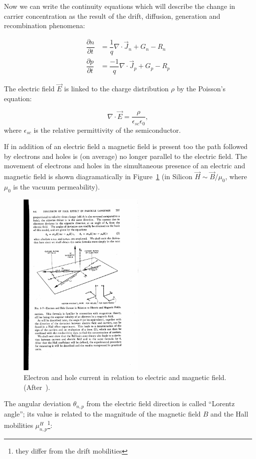 Now we can write the continuity equations which will describe the change in carrier concentration 
as the result of the drift, diffusion, generation and recombination phenomena:

\begin{align}
\dfrac{\partial n}{\partial t}&=\dfrac{1}{q}\nabla\cdot\vec{J}_n+G_n-R_n\label{eq:nCont}\\
\dfrac{\partial p}{\partial t}&=\dfrac{-1}{q}\nabla\cdot\vec{J}_p+G_p-R_p\label{eq:pCont}
\end{align}

The electric field $\vec{E}$ is linked to the charge distribution $\rho$ by the Poisson's equation:

\begin{equation}
\nabla\cdot\vec{E}=\dfrac{\rho}{\epsilon_{sc}\epsilon_{0}},
\label{eq:Poisson}
\end{equation}
where $\epsilon_{sc}$ is the relative permittivity of the semiconductor.



If in addition of an electric field a magnetic field is present too 
the path followed by electrons and holes is (on average) no longer parallel 
to the electric field. The movement of electrons and holes in the simultaneous presence of an electric and magnetic field is shown diagramatically in Figure~\ref{fig:LorentzAngle} 
(in Silicon $\vec H\sim\vec B/\mu_0$, where $\mu_0$ is the vacuum permeability).
\begin{figure}[htbp]
   \centering
   \includegraphics[width=0.55\textwidth]{LorentzAngle.pdf} 
   \caption{\label{fig:LorentzAngle}Electron and hole current in relation to electric and magnetic field. 
   (After~\cite{Shockley}).}
\end{figure}
The angular deviation $\theta_{n,p}$ from the electric field direction is called ``Lorentz angle''; its value 
is related to the 
magnitude of the magnetic field $B$ and the Hall mobilities $\mu_{n,p}^H$\footnote{they differ from 
the drift mobilities}:

